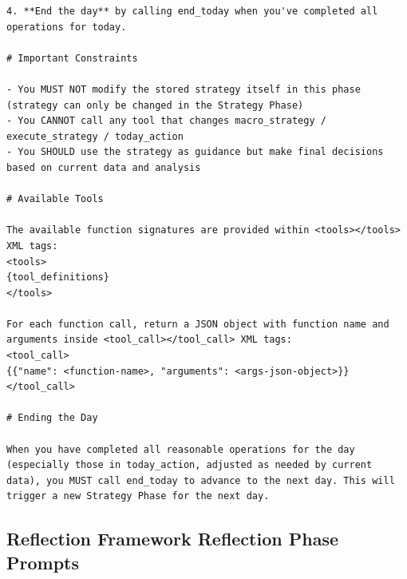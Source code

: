 \begin{Verbatim}[breaklines=true, breakanywhere=true]
4. **End the day** by calling end_today when you've completed all operations for today.

# Important Constraints

- You MUST NOT modify the stored strategy itself in this phase (strategy can only be changed in the Strategy Phase)
- You CANNOT call any tool that changes macro_strategy / execute_strategy / today_action
- You SHOULD use the strategy as guidance but make final decisions based on current data and analysis

# Available Tools

The available function signatures are provided within <tools></tools> XML tags:
<tools>
{tool_definitions}
</tools>

For each function call, return a JSON object with function name and arguments inside <tool_call></tool_call> XML tags:
<tool_call>
{{"name": <function-name>, "arguments": <args-json-object>}}
</tool_call>

# Ending the Day

When you have completed all reasonable operations for the day (especially those in today_action, adjusted as needed by current data), you MUST call end_today to advance to the next day. This will trigger a new Strategy Phase for the next day.
\end{Verbatim}

\subsection{Reflection Framework Reflection Phase Prompts}

